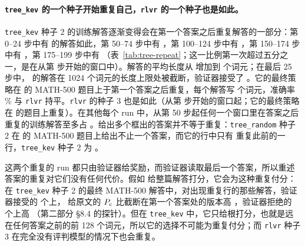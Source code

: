 \paragraph{\texttt{tree\_kev} 的一个种子开始重复自己，\texttt{rlvr} 的一个种子也是如此。} \texttt{tree\_kev} 种子 2 的训练解答逐渐变得会在第一个答案之后重复解答的一部分：第 0--24 步中有  的解答如此，第 50--74 步中有 ，第 100--124 步中有 ，第 150--174 步中有 ，第 175--199 步中有 （表~\ref{tab:tree-repeat}；这一比例第一次超过五分之一，是在从第  步开始的窗口中）。解答的平均长度从  增加到  个词元；在最后 25 步中， 的解答在 1024 个词元的长度上限处被截断，验证器接受了 。它的最终策略在  的 MATH-500 题目上于第一个答案之后重复，每个解答写  个词元，准确率 \% 与 \texttt{rlvr} 持平。\texttt{rlvr} 的种子 3 也是如此（从第  步开始的窗口起；它的最终策略在  的题目上重复）。在其他每个 run 中，从第 50 步起任何一个窗口里在答案之后重复的训练解答至多占 。给出多个框出的答案并不等于重复：\texttt{tree\_random} 种子 2 在  的 MATH-500 题目上给出不止一个答案，而它的行中只有  重复此前的一行，\texttt{tree\_kev} 种子 2 为 。

这两个重复的 run 都只由验证器给奖励，而验证器读取最后一个答案，所以重述答案的重复对它们没有任何代价。假如 \kev{} 给整篇解答打分，它会为这种重复付分：在 \texttt{tree\_kev} 种子 2 的最终 MATH-500 解答中，对出现重复行的那些解答，验证器接受的  个上，\kev{} 给原文的 $P_{\mathrm{c}}$ 比截断在第一个答案处的版本高  ，验证器拒绝的  个上高  （第二部分 \S8.4 的探针）。但在 \texttt{tree\_kev} 中，它只给根打分，也就是远在任何答案之前的前 128 个词元，所以它的选择不可能为重复付分；而 \texttt{rlvr} 种子 3 在完全没有评判模型的情况下也会重复。

\begin{table}[t]
\centering\small

\caption{在第一个框出的答案之后重复解答一部分（出现一行至少 20 个字符、此前已出现过的内容）的解答比例：每个 run 在五个 25 步窗口中的训练解答，以及最终策略在 MATH-500 上的贪心解答。}
\label{tab:tree-repeat}
\end{table}

